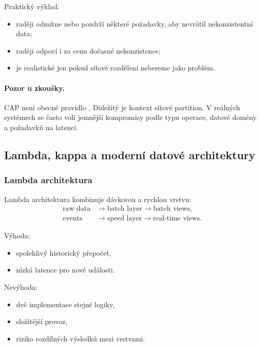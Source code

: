 Praktický výklad:
\begin{itemize}
    \item {} raději odmítne nebo pozdrží některé požadavky, aby nevrátil nekonzistentní data;
    \item {} raději odpoví i za cenu dočasné nekonzistence;
    \item {} je realistické jen pokud síťové rozdělení nebereme jako problém.
\end{itemize}

\paragraph{Pozor u zkoušky.}
CAP není obecné pravidlo . Důležitý je kontext síťové partition.
V reálných systémech se často volí jemnější kompromisy podle typu operace, datové domény a požadavků na
latenci.

\subsection{Lambda, kappa a moderní datové architektury}

\subsubsection{Lambda architektura}

Lambda architektura kombinuje dávkovou a rychlou vrstvu:
\[
\begin{aligned}
\text{raw data}
&\rightarrow
\text{batch layer}
\rightarrow
\text{batch views},\\
\text{events}
&\rightarrow
\text{speed layer}
\rightarrow
\text{real-time views}.
\end{aligned}
\]

Výhoda:
\begin{itemize}
    \item spolehlivý historický přepočet,
    \item nízká latence pro nové události.
\end{itemize}

Nevýhoda:
\begin{itemize}
    \item dvě implementace stejné logiky,
    \item složitější provoz,
    \item riziko rozdílných výsledků mezi vrstvami.
\end{itemize}

